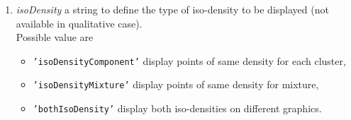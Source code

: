 \begin{enumerate}
  \item {\em isoDensity} a string to define the type of iso-density to be displayed
                           (not available in qualitative case).\\
 Possible value are
    \begin{itemize}
      \item {\tt 'isoDensityComponent'} display points of same density for each cluster,
      \item {\tt 'isoDensityMixture'} display points of same density for mixture,
      \item {\tt 'bothIsoDensity'} display both iso-densities on different graphics.
    \end{itemize}


\end{enumerate}


